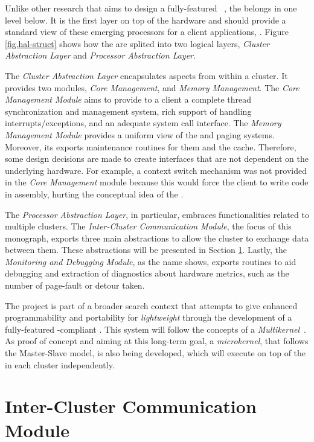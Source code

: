 	Unlike other research that aims to design a fully-featured \os~\cite{},
	the \hal belongs in one level below.
	It is the first layer on top of the hardware and should provide a standard
	view of these emerging processors for a client applications, \ie \os.
	Figure \ref{fig.hal-struct} shows how the \hal are splited into two logical layers,
	\textit{Cluster Abstraction Layer} and \textit{Processor Abstraction Layer}.

	The \textit{Cluster Abstraction Layer} encapsulates aspects from within a cluster.
	It provides two modules, \textit{Core Management}, and \textit{Memory Management}.
	The \textit{Core Management Module} aims to provide to a client \os a complete
	thread synchronization and management system, rich support of handling
	interrupts/exceptions, and an adequate system call interface.
	The \textit{Memory Management Module} provides a uniform view of the \tlbs
	and paging systems.
	Moreover, its exports maintenance routines for them and the cache.
	Therefore, some design decisions are made to create interfaces that are not
	dependent on the underlying hardware.
	For example, a context switch mechanism was not provided in the
	\textit{Core Management} module because this would force the client \os
	to write code in assembly, hurting the conceptual idea of the \hal.

	The \textit{Processor Abstraction Layer}, in particular, embraces
	functionalities related to multiple clusters.
	The \textit{Inter-Cluster Communication Module}, the focus of
	this monograph, exports three main abstractions to allow the
	cluster to exchange data between them.
	These abstractions will be presented in Section \ref{sec.inter-cluster-communication}.
	Lastly, the \textit{Monitoring and Debugging Module}, as the
	name shows, exports routines to aid debugging and extraction
	of diagnostics about hardware metrics, such as the number of
	page-fault or detour taken.

	The \hal project is part of a broader search context that
	attempts to give enhanced programmability and portability
	for \textit{lightweight \manycores} through the development
	of a fully-featured \posix-compliant \os.
	This system will follow the concepts of a \textit{Multikernel}~\cite{}.
	As proof of concept and aiming at this long-term goal,
	a \textit{microkernel}, that follows the Master-Slave model,
	is also being developed, which will execute on top of the \hal
	in each cluster independently.

\section{Inter-Cluster Communication Module}
\label{sec.inter-cluster-communication}

